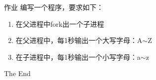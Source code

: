\documentclass{beamer}
\begin{document}
\begin{frame}{作业}
编写一个程序，要求如下：
\begin{enumerate}
\item
在父进程中fork出一个子进程
\item
在父进程中，每1秒输出一个大写字母：A$\sim$Z
\item
在子进程中，每1秒输出一个小写字母：a$\sim$z
\end{enumerate}
\end{frame}

\begin{frame}
\Huge{\centerline{The End}}
\end{frame}
\end{document}

